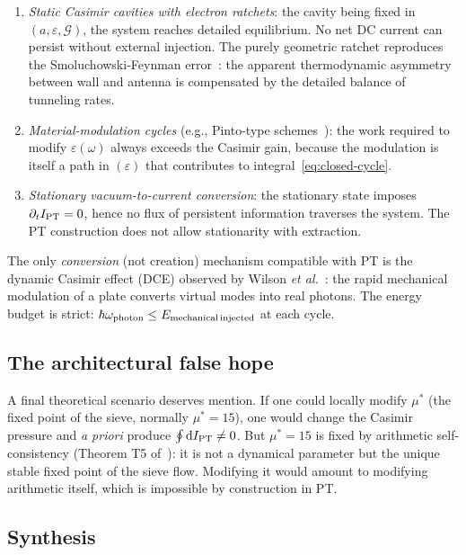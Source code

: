 \documentclass[11pt,a4paper]{article}
\newcommand{\IPT}{I_{\rm PT}}
\begin{document}
\begin{enumerate}
  \item \emph{Static Casimir cavities with electron ratchets}: the cavity being fixed in
  $(a, \varepsilon, \mathcal{G})$, the system reaches detailed equilibrium. No net DC current
  can persist without external injection. The purely geometric ratchet reproduces the
  Smoluchowski-Feynman error~\cite{Feynman1963}: the apparent thermodynamic asymmetry between
  wall and antenna is compensated by the detailed balance of tunneling rates.

  \item \emph{Material-modulation cycles} (e.g., Pinto-type schemes~\cite{Pinto1999}): the
  work required to modify $\varepsilon(\omega)$ always exceeds the Casimir gain, because the
  modulation is itself a path in $(\varepsilon)$ that contributes to
  integral~\eqref{eq:closed-cycle}.

  \item \emph{Stationary vacuum-to-current conversion}: the stationary state imposes
  $\partial_{t} \IPT = 0$, hence no flux of persistent information traverses the system. The
  PT construction does not allow stationarity with extraction.
\end{enumerate}

The only \emph{conversion} (not creation) mechanism compatible with PT is the dynamic Casimir
effect (DCE) observed by Wilson \emph{et al.}~\cite{Wilson2011}: the rapid mechanical
modulation of a plate converts virtual modes into real photons. The energy budget is strict:
$\hbar\omega_{\rm photon} \leq E_{\rm mechanical\,injected}$ at each cycle.

\subsection{The architectural false hope}

A final theoretical scenario deserves mention. If one could locally modify $\mu^{*}$ (the
fixed point of the sieve, normally $\mu^{*} = 15$), one would change the Casimir pressure and
\emph{a priori} produce $\oint \mathrm{d}\IPT \neq 0$. But $\mu^{*} = 15$ is fixed by
arithmetic self-consistency (Theorem T5 of~\cite{Senez2026}): it is not a dynamical parameter
but the unique stable fixed point of the sieve flow. Modifying it would amount to modifying
arithmetic itself, which is impossible by construction in PT.

\subsection{Synthesis}
\end{document}
